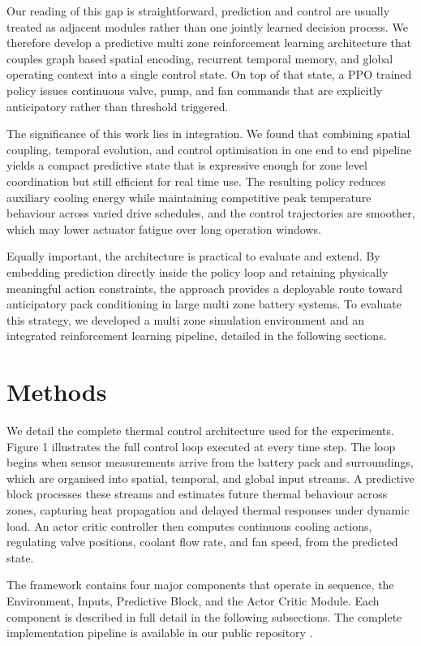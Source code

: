 \documentclass[twocolumn]{article}
\begin{document}
Our reading of this gap is straightforward, prediction and control are usually treated as adjacent modules rather than one jointly learned decision process. We therefore develop a predictive multi zone reinforcement learning architecture that couples graph based spatial encoding, recurrent temporal memory, and global operating context into a single control state. On top of that state, a PPO trained policy issues continuous valve, pump, and fan commands that are explicitly anticipatory rather than threshold triggered.

The significance of this work lies in integration. We found that combining spatial coupling, temporal evolution, and control optimisation in one end to end pipeline yields a compact predictive state that is expressive enough for zone level coordination but still efficient for real time use. The resulting policy reduces auxiliary cooling energy while maintaining competitive peak temperature behaviour across varied drive schedules, and the control trajectories are smoother, which may lower actuator fatigue over long operation windows.

Equally important, the architecture is practical to evaluate and extend. By embedding prediction directly inside the policy loop and retaining physically meaningful action constraints, the approach provides a deployable route toward anticipatory pack conditioning in large multi zone battery systems. To evaluate this strategy, we developed a multi zone simulation environment and an integrated reinforcement learning pipeline, detailed in the following sections.

\section*{Methods}

We detail the complete thermal control architecture used for the experiments. Figure 1 illustrates the full control loop executed at every time step. The loop begins when sensor measurements arrive from the battery pack and surroundings, which are organised into spatial, temporal, and global input streams. A predictive block processes these streams and estimates future thermal behaviour across zones, capturing heat propagation and delayed thermal responses under dynamic load. An actor critic controller then computes continuous cooling actions, regulating valve positions, coolant flow rate, and fan speed, from the predicted state.

The framework contains four major components that operate in sequence, the Environment, Inputs, Predictive Block, and the Actor Critic Module. Each component is described in full detail in the following subsections. The complete implementation pipeline is available in our public repository \cite{KeshavRepo2026}.
\end{document}

